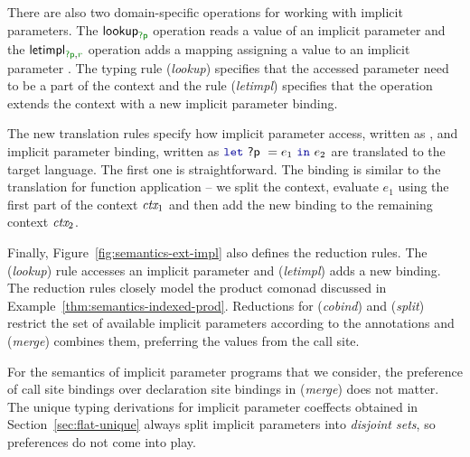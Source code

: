 There are also two domain-specific operations for working with implicit parameters. The
$\ident{lookup}_{\cclrd{\ident{?p}}}$ operation reads a value of an implicit parameter and
the $\ident{letimpl}_{\cclrd{\ident{?p}}, \cclrd{r}}$ operation adds a mapping assigning a value
to an implicit parameter . The typing rule (\emph{lookup}) specifies that the accessed
parameter need to be a part of the context and the rule (\emph{letimpl}) specifies that the
 operation extends the context with a new implicit parameter binding.

The new translation rules specify how implicit parameter access, written as , and
implicit parameter binding, written as $\kvd{let}~\ident{?p}~=e_1~\kvd{in}~e_2$ are translated to the
target language. The first one is straightforward. The binding is similar to the translation for
function application -- we split the context, evaluate $e_1$ using the first part of the context
$\textit{ctx}_1$ and then add the new binding to the remaining context $\textit{ctx}_2$.

Finally, Figure~\ref{fig:semantics-ext-impl} also defines the reduction rules. The (\emph{lookup})
rule accesses an implicit parameter and (\emph{letimpl}) adds a new binding. The reduction rules
closely model the product comonad discussed in Example~\ref{thm:semantics-indexed-prod}. Reductions
for (\emph{cobind}) and (\emph{split}) restrict the set of available implicit parameters according
to the annotations and (\emph{merge}) combines them, preferring the values from the call site.

For the semantics of implicit parameter programs that we consider, the preference of call site
bindings over declaration site bindings in (\emph{merge}) does not matter. The unique typing
derivations for implicit parameter coeffects obtained in Section~\ref{sec:flat-unique} always
split implicit parameters into \emph{disjoint sets}, so preferences do not come into play.


